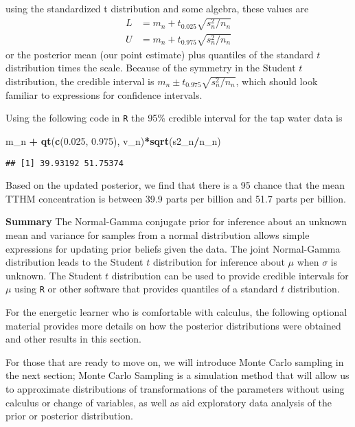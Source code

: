 \documentclass[]{book}
\newenvironment{Shaded}{\begin{snugshade}}{\end{snugshade}}
\newcommand{\KeywordTok}[1]{\textcolor[rgb]{0.13,0.29,0.53}{\textbf{#1}}}
\newcommand{\FloatTok}[1]{\textcolor[rgb]{0.00,0.00,0.81}{#1}}
\newcommand{\StringTok}[1]{\textcolor[rgb]{0.31,0.60,0.02}{#1}}
\newcommand{\OperatorTok}[1]{\textcolor[rgb]{0.81,0.36,0.00}{\textbf{#1}}}
\newcommand{\NormalTok}[1]{#1}
\theoremstyle{definition}
\theoremstyle{definition}
\theoremstyle{remark}
\begin{document}
using the standardized t distribution and some algebra, these values are
\[
\begin{aligned}
  L & =  m_n + t_{0.025}\sqrt{s^2_n/n_n}    \\
  U & =  m_n + t_{0.975}\sqrt{s^2_n/n_n}
\end{aligned}
\] or the posterior mean (our point estimate) plus quantiles of the
standard \(t\) distribution times the scale. Because of the symmetry in
the Student \(t\) distribution, the credible interval is
\(m_n \pm t_{0.975}\sqrt{s^2_n/n_n}\), which should look familiar to
expressions for confidence intervals.

Using the following code in \texttt{R} the 95\% credible interval for
the tap water data is

\begin{Shaded}
\begin{Highlighting}[]
\NormalTok{m_n }\OperatorTok{+}\StringTok{ }\KeywordTok{qt}\NormalTok{(}\KeywordTok{c}\NormalTok{(}\FloatTok{0.025}\NormalTok{, }\FloatTok{0.975}\NormalTok{), v_n)}\OperatorTok{*}\KeywordTok{sqrt}\NormalTok{(s2_n}\OperatorTok{/}\NormalTok{n_n)}
\end{Highlighting}
\end{Shaded}

\begin{verbatim}
## [1] 39.93192 51.75374
\end{verbatim}

Based on the updated posterior, we find that there is a 95 chance that
the mean TTHM concentration is between 39.9 parts per billion and 51.7
parts per billion.

\textbf{Summary} The Normal-Gamma conjugate prior for inference about an
unknown mean and variance for samples from a normal distribution allows
simple expressions for updating prior beliefs given the data. The joint
Normal-Gamma distribution leads to the Student \(t\) distribution for
inference about \(\mu\) when \(\sigma\) is unknown. The Student \(t\)
distribution can be used to provide credible intervals for \(\mu\) using
\texttt{R} or other software that provides quantiles of a standard \(t\)
distribution.

For the energetic learner who is comfortable with calculus, the
following optional material provides more details on how the posterior
distributions were obtained and other results in this section.

For those that are ready to move on, we will introduce Monte Carlo
sampling in the next section; Monte Carlo Sampling is a simulation
method that will allow us to approximate distributions of
transformations of the parameters without using calculus or change of
variables, as well as aid exploratory data analysis of the prior or
posterior distribution.
\end{document}
